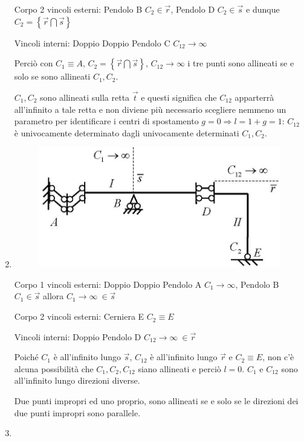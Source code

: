 \documentclass{article}
\begin{document}
\begin{adjustwidth}{2in}{}
\begin{enumerate}
Corpo 2 vincoli esterni: Pendolo B $C_2 \in \vec{r}$, Pendolo D $C_2 \in \vec{s}$ e dunque $C_2 = \left\lbrace \vec{r} \bigcap \vec{s}\right\rbrace$ \newline

Vincoli interni: Doppio Doppio Pendolo C $C_{12} \rightarrow \infty$ \newline

Perciò con $C_1 \equiv A$, $C_2 = \left\lbrace \vec{r} \bigcap \vec{s}\right\rbrace$, $C_{12} \rightarrow \infty$ i tre punti sono allineati se e solo se sono allineati $C_1, C_2$.

$C_1, C_2$ sono allineati sulla retta $\vec{t}$ e questi significa che $C_{12}$ apparterrà all'infinito a tale retta e non diviene più necessario scegliere nemmeno un parametro per identificare i centri di spostamento $g=0 \Rightarrow l = 1+g = 1$: $C_{12}$ è univocamente determinato dagli univocamente determinati $C_1, C_2$. 

\item \mbox{}

\begin{figure}[H]
	\centering
	\includegraphics[width=0.4\linewidth]{immagini/1.PARTE3_Pagina_17 (2)}
\end{figure}
Corpo 1 vincoli esterni: Doppio Doppio Pendolo A $C_{1} \rightarrow \infty$, Pendolo B $C_1 \in \vec{s}$ allora $C_1 \rightarrow \infty ~ \in \vec{s}$ \newline

Corpo 2 vincoli esterni: Cerniera E $C_2 \equiv E$ \newline

Vincoli interni: Doppio Pendolo D $C_{12} \rightarrow \infty ~ \in \vec{r}$\newline

Poiché $C_{1}$ è all'infinito lungo $\vec{s}$, $C_{12}$ è all'infinito lungo $\vec{r}$ e $C_2 \equiv E$, non c'è alcuna possibilità che $C_1, C_2, C_{12}$ siano allineati e perciò $l = 0$. 
$C_{1}$ e $C_{12}$ sono all'infinito lungo direzioni diverse. \newline

Due punti impropri ed uno proprio, sono allineati se e solo se le direzioni dei due punti impropri sono parallele. \newline
\newpage
\item \mbox{}


\end{enumerate}
\end{adjustwidth}
\end{document}
